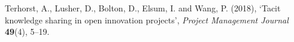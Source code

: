 
\hangindent=0.5cm Terhorst, A., Lusher, D., Bolton, D., Elsum, I. and Wang, P. (2018), \lq Tacit knowledge sharing in open innovation projects\rq, \textit{Project Management Journal} \textbf{49}(4), 5--19.

